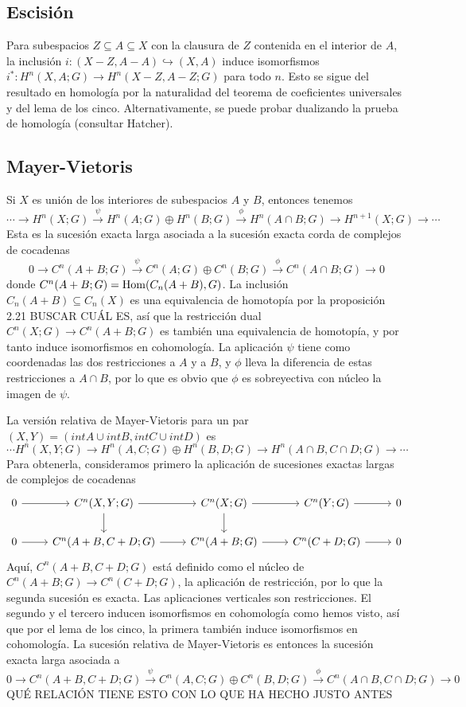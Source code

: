 \documentclass[TA.tex]{subfiles}
\begin{document}
\subsection{Escisión}
Para subespacios $Z\subseteq A\subseteq X$ con la clausura de $Z$ contenida en el interior de $A$, la inclusión $i:(X-Z,A-A)\hookrightarrow(X,A)$ induce isomorfismos $i^*:H^n(X,A;G)\to H^n(X-Z,A-Z;G)$ para todo $n$. Esto se sigue del resultado en homología por la naturalidad del teorema de coeficientes universales y del lema de los cinco. Alternativamente, se puede probar dualizando la prueba de homología (consultar Hatcher). 

\subsection{Mayer-Vietoris}
Si $X$ es unión de los interiores de subespacios $A$ y $B$, entonces tenemos
\[
\cdots\to H^n(X;G)\xrightarrow{\psi} H^n(A;G)\oplus H^n(B;G)\xrightarrow{\phi} H^n(A\cap B;G)\to H^{n+1}(X;G)\to\cdots
\]
Esta es la sucesión exacta larga asociada a la sucesión exacta corda de complejos de cocadenas
\[
0\to C^n(A+B;G)\xrightarrow{\psi}C^n(A;G)\oplus C^n(B;G)\xrightarrow{\phi} C^n(A\cap B;G)\to 0
\]
donde $C^n(A+B;G)=\operatorname{Hom}(C_n(A+B),G)$. La inclusión $C_n(A+B)\subseteq C_n(X)$ es una equivalencia de homotopía por la proposición 2.21 BUSCAR CUÁL ES, así que la restricción dual $C^n(X;G)\to C^n(A+B;G)$ es también una equivalencia de homotopía, y por tanto induce isomorfismos en cohomología. La aplicación $\psi$ tiene como coordenadas las dos restricciones a $A$ y a $B$, y $\phi$ lleva la diferencia de estas restricciones a $A\cap B$, por lo que es obvio que $\phi$ es sobreyectiva con núcleo la imagen de $\psi$. 

La versión relativa de Mayer-Vietoris para un par $(X,Y)=(int A\cup int B, int C\cup int D)$ es
\[
\cdots H^n(X,Y;G)\to H^n(A,C;G)\oplus H^n(B,D;G)\to H^n(A\cap B,C\cap D;G)\to\cdots
\]
Para obtenerla, consideramos primero la aplicación de sucesiones exactas largas de complejos de cocadenas
\[
\begin{tikzcd}
0\arrow[r] & C^n(X,Y;G)\arrow[r]\arrow[d] & C^n(X;G)\arrow[r]\arrow[d] & C^n(Y;G)\arrow[r] & 0\\
0\arrow[r] & C^n(A+B,C+D;G)\arrow[r] & C^n(A+B;G)\arrow[r] & C^n(C+D;G)\arrow[r] & 0
\end{tikzcd}
\]
Aquí, $C^n(A+B,C+D;G)$ está definido como el núcleo de $C^n(A+B;G)\to C^n(C+D;G)$, la aplicación de restricción, por lo que la segunda sucesión es exacta. Las aplicaciones verticales son restricciones. El segundo y el tercero inducen isomorfismos en cohomología como hemos visto, así que por el lema de los cinco, la primera también induce isomorfismos en cohomología. La sucesión relativa de Mayer-Vietoris es entonces la sucesión exacta larga asociada a
\[
0\to C^n(A+B,C+D;G)\xrightarrow{\psi} C^n(A,C;G)\oplus C^n(B,D;G)\xrightarrow{\phi} C^n(A\cap B, C\cap D;G)\to 0
\]
QUÉ RELACIÓN TIENE ESTO CON LO QUE HA HECHO JUSTO ANTES
\end{document}
